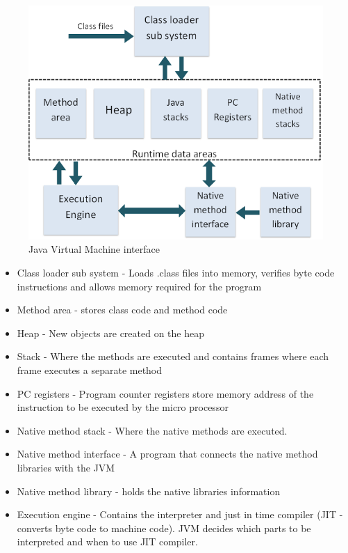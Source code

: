 \documentclass[interim_report.tex]{subfiles}
\begin{document}
\begin{figure}[H]
	\centering
	\includegraphics[width=\textwidth]{img/jvm.png}
	\caption{Java Virtual Machine interface \cite{jvm}}
	\label{fig:jvm}
\end{figure}

\begin{itemize}
	\item Class loader sub system - Loads .class files into memory, verifies byte code instructions and allows memory required for the program
	\item Method area - stores class code and method code
	\item Heap - New objects are created on the heap
	\item Stack - Where the methods are executed and contains frames where each frame executes a separate method
	\item PC registers - Program counter registers store memory address of the instruction to be executed by the micro processor
	\item Native method stack - Where the native methods are executed.
	\item Native method interface - A program that connects the native method libraries with the JVM
	\item Native method library - holds the native libraries information
	\item Execution engine - Contains the interpreter and just in time compiler (JIT - converts byte code to machine code). JVM decides which parts to be interpreted and when to use JIT compiler.
\end{itemize}
\end{document}
